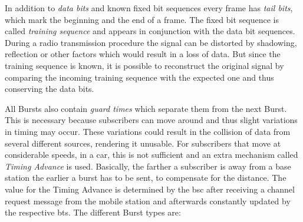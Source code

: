 In addition to \emph{data bits} and known fixed bit sequences every frame has \emph{tail bits}, which mark the beginning and the end of a frame.
The fixed bit sequence is called \emph{training sequence} and appears in conjunction with the data bit sequences.
During a radio transmission procedure the signal can be distorted by shadowing, reflection or other factors which would result in a loss of data.
But since the training sequence is known, it is possible to reconstruct the original signal by comparing the incoming training sequence with the expected one and thus conserving the data bits.

All Bursts also contain \emph{guard times} which separate them from the next Burst.
This is necessary because subscribers can move around and thus slight variations in timing may occur.
These variations could result in the collision of data from several different sources, rendering it unusable.
For subscribers that move at considerable speeds, \eg in a car, this is not sufficient and an extra mechanism called \emph{Timing Advance} is used.
Basically, the farther a subscriber is away from a base station the earlier a burst has to be sent, to compensate for the distance.
The value for the Timing Advance is determined by the \gls{bsc} after receiving a channel request message from the mobile station and afterwards constantly updated by the respective \gls{bts}.
The different Burst types are:
